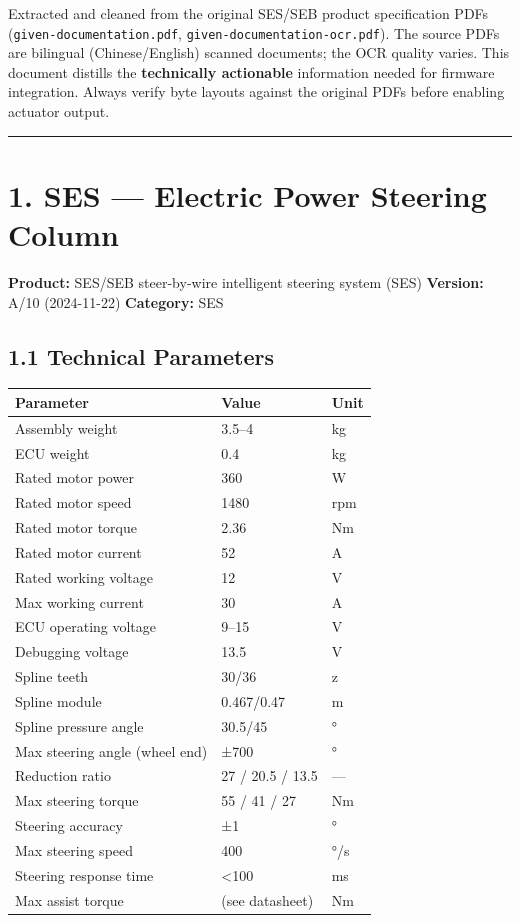 \documentclass[12pt,a4paper,oneside]{report}
\begin{document}
Extracted and cleaned from the original SES/SEB product specification PDFs
(\texttt{given-documentation.pdf}, \texttt{given-documentation-ocr.pdf}). The
source PDFs are bilingual (Chinese/English) scanned documents; the OCR quality
varies. This document distills the \textbf{technically actionable} information
needed for firmware integration. Always verify byte layouts against the original
PDFs before enabling actuator output.

\begin{center}\rule{0.5\linewidth}{0.5pt}\end{center}

\section{1. SES --- Electric Power Steering
Column}\label{SES-electric-power-steering-column}

\textbf{Product:} SES/SEB steer-by-wire intelligent steering system (SES)
\textbf{Version:} A/10 (2024-11-22) \textbf{Category:} SES

\subsection{1.1 Technical Parameters}\label{technical-parameters}

\begin{longtable}[]{@{}lll@{}}
\toprule\noalign{}
Parameter & Value & Unit \\
\midrule\noalign{}
\endhead
\bottomrule\noalign{}
\endlastfoot
Assembly weight & 3.5--4 & kg \\
ECU weight & 0.4 & kg \\
Rated motor power & 360 & W \\
Rated motor speed & 1480 & rpm \\
Rated motor torque & 2.36 & Nm \\
Rated motor current & 52 & A \\
Rated working voltage & 12 & V \\
Max working current & 30 & A \\
ECU operating voltage & 9--15 & V \\
Debugging voltage & 13.5 & V \\
Spline teeth & 30/36 & z \\
Spline module & 0.467/0.47 & m \\
Spline pressure angle & 30.5/45 & ° \\
Max steering angle (wheel end) & ±700 & ° \\
Reduction ratio & 27 / 20.5 / 13.5 & --- \\
Max steering torque & 55 / 41 / 27 & Nm \\
Steering accuracy & ±1 & ° \\
Max steering speed & 400 & °/s \\
Steering response time & \textless100 & ms \\
Max assist torque & (see datasheet) & Nm \\
\end{longtable}
\end{document}
